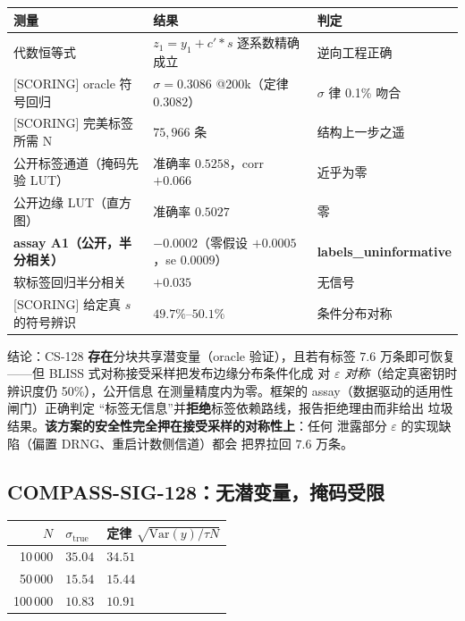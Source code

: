 \documentclass[11pt,a4paper]{ctexart}
\begin{document}
\begin{table}[htbp]\centering\small
\begin{tabular}{@{}lll@{}}
\toprule
测量 & 结果 & 判定 \\
\midrule
代数恒等式 & $z_1 = y_1 + c'{\ast}s$ 逐系数精确成立 & 逆向工程正确 \\
{[SCORING]} oracle 符号回归 & $\sigma=0.3086$ @200k（定律 $0.3082$） & $\sigma$ 律 0.1\% 吻合 \\
{[SCORING]} 完美标签所需 N & $75{,}966$ 条 & 结构上一步之遥 \\
公开标签通道（掩码先验 LUT） & 准确率 $0.5258$，corr $+0.066$ & 近乎为零 \\
公开边缘 LUT（直方图） & 准确率 $0.5027$ & 零 \\
\textbf{assay A1（公开，半分相关）} & $-0.0002$（零假设 $+0.0005$，se $0.0009$） &
\textbf{labels\_uninformative} \\
软标签回归半分相关 & $+0.035$ & 无信号 \\
{[SCORING]} 给定真 $s$ 的符号辨识 & $49.7\%$--$50.1\%$ & 条件分布对称 \\
\bottomrule
\end{tabular}
\end{table}

结论：CS-128 \textbf{存在}分块共享潜变量（oracle 验证），且若有标签
$7.6$ 万条即可恢复——但 BLISS 式对称接受采样把发布边缘分布条件化成
对 $\varepsilon$ \emph{对称}（给定真密钥时辨识度仍 50\%），公开信息
在测量精度内为零。框架的 assay（数据驱动的适用性闸门）正确判定
``标签无信息''并\textbf{拒绝}标签依赖路线，报告拒绝理由而非给出
垃圾结果。\textbf{该方案的安全性完全押在接受采样的对称性上}：任何
泄露部分 $\varepsilon$ 的实现缺陷（偏置 DRNG、重启计数侧信道）都会
把界拉回 $7.6$ 万条。

\subsection{COMPASS-SIG-128：无潜变量，掩码受限}

\begin{table}[htbp]\centering\small
\begin{tabular}{@{}rll@{}}
\toprule
$N$ & $\sigma_{\mathrm{true}}$ & 定律 $\sqrt{\mathrm{Var}(y)/\tau N}$ \\
\midrule
10\,000 & $35.04$ & $34.51$ \\
50\,000 & $15.54$ & $15.44$ \\
100\,000 & $10.83$ & $10.91$ \\
\bottomrule
\end{tabular}
\end{table}
\end{document}
